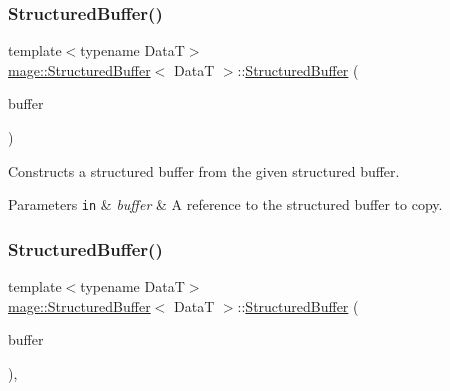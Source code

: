 \subsubsection{\texorpdfstring{Structured\+Buffer()}{StructuredBuffer()}\hspace{0.1cm}{\footnotesize\ttfamily [3/4]}}
{\footnotesize\ttfamily template$<$typename DataT$>$ \\
\hyperlink{classmage_1_1_structured_buffer}{mage\+::\+Structured\+Buffer}$<$ DataT $>$\+::\hyperlink{classmage_1_1_structured_buffer}{Structured\+Buffer} (\begin{DoxyParamCaption}\item[{const \hyperlink{classmage_1_1_structured_buffer}{Structured\+Buffer}$<$ DataT $>$ \&}]{buffer }\end{DoxyParamCaption})\hspace{0.3cm}{\ttfamily [delete]}}

Constructs a structured buffer from the given structured buffer.


\begin{DoxyParams}[1]{Parameters}
\mbox{\tt in}  & {\em buffer} & A reference to the structured buffer to copy. \\
\hline
\end{DoxyParams}
\hypertarget{classmage_1_1_structured_buffer_a9ecb838624ca5003cc3394adbe81bb3c}{}\label{classmage_1_1_structured_buffer_a9ecb838624ca5003cc3394adbe81bb3c} 
\subsubsection{\texorpdfstring{Structured\+Buffer()}{StructuredBuffer()}\hspace{0.1cm}{\footnotesize\ttfamily [4/4]}}
{\footnotesize\ttfamily template$<$typename DataT$>$ \\
\hyperlink{classmage_1_1_structured_buffer}{mage\+::\+Structured\+Buffer}$<$ DataT $>$\+::\hyperlink{classmage_1_1_structured_buffer}{Structured\+Buffer} (\begin{DoxyParamCaption}\item[{\hyperlink{classmage_1_1_structured_buffer}{Structured\+Buffer}$<$ DataT $>$ \&\&}]{buffer }\end{DoxyParamCaption})\hspace{0.3cm}{\ttfamily [default]}, {\ttfamily [noexcept]}}

